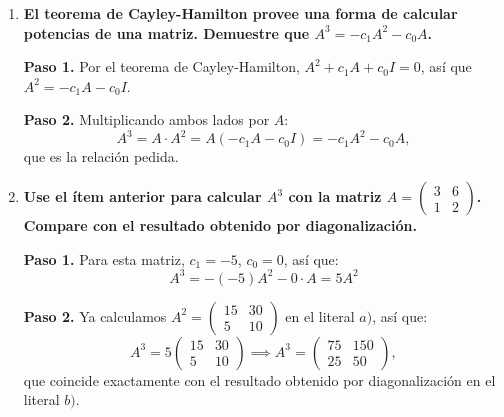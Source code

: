 \begin{prob}
\begin{enumerate}[$a)$]
\begin{myproof}
\textbf{Paso 3.} Calculamos $A^3 = P D^3 P^{-1}$:
\[
D^3 = \begin{pmatrix} 125 & 0 \\ 0 & 0 \end{pmatrix}, \qquad
P^{-1} = \frac{1}{5} \begin{pmatrix} 1 & 2 \\ -1 & 3 \end{pmatrix}
\]
\[
A^3 = \begin{pmatrix} 3 & -2 \\ 1 & 1 \end{pmatrix} \begin{pmatrix} 125 & 0 \\ 0 & 0 \end{pmatrix} \frac{1}{5} \begin{pmatrix} 1 & 2 \\ -1 & 3 \end{pmatrix}
\implies \boxed{A^3 = \begin{pmatrix} 75 & 150 \\ 25 & 50 \end{pmatrix}.}
\]
El literal $d)$ obtiene este mismo resultado mediante el teorema de Cayley-Hamilton.
\end{myproof}
\item \textbf{El teorema de Cayley-Hamilton provee una forma de calcular potencias de una matriz. Demuestre que $A^3 = -c_1A^2 - c_0A$.}
\begin{myproof}
\textbf{Paso 1.} Por el teorema de Cayley-Hamilton, $A^2 + c_1A + c_0I = 0$, así que $A^2 = -c_1A - c_0I$.

\textbf{Paso 2.} Multiplicando ambos lados por $A$:
\[
A^3 = A \cdot A^2 = A(-c_1A - c_0I) = -c_1A^2 - c_0A,
\]
que es la relación pedida.
\end{myproof}
\item \textbf{Use el ítem anterior para calcular $A^3$ con la matriz $A = \begin{pmatrix} 3 & 6 \\ 1 & 2 \end{pmatrix}$. Compare con el resultado obtenido por diagonalización.}
\begin{myproof}
\textbf{Paso 1.} Para esta matriz, $c_1 = -5$, $c_0 = 0$, así que:
\[
A^3 = -(-5)A^2 - 0 \cdot A = 5A^2
\]

\textbf{Paso 2.} Ya calculamos $A^2 = \begin{pmatrix} 15 & 30 \\ 5 & 10 \end{pmatrix}$ en el literal $a)$, así que:
\[
A^3 = 5 \begin{pmatrix} 15 & 30 \\ 5 & 10 \end{pmatrix} \implies \boxed{A^3 = \begin{pmatrix} 75 & 150 \\ 25 & 50 \end{pmatrix},}
\]
que coincide exactamente con el resultado obtenido por diagonalización en el literal $b)$.
\end{myproof}
\end{enumerate}
\end{prob}

